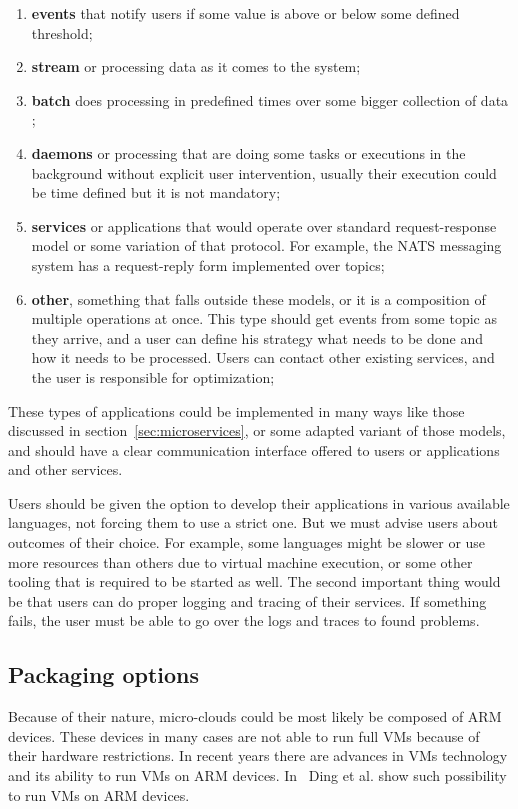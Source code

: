 \begin{enumerate}[start=1,label={(\bfseries \arabic*)}]
	\item \textbf{events} that notify users if some value is above or below some defined threshold; 
	\item \textbf{stream} or processing data as it comes to the system;
	\item \textbf{batch} does processing in predefined times over some bigger collection of data ;
	\item \textbf{daemons} or processing that are doing some tasks or executions in the background without explicit user intervention, usually their execution could be time defined but it is not mandatory;
	\item \textbf{services} or applications that would operate over standard request-response model or some variation of that protocol. For example, the NATS messaging system has a request-reply form implemented over topics;
	\item \textbf{other}, something that falls outside these models, or it is a composition of multiple operations at once. This type should get events from some topic as they arrive, and a user can define his strategy what needs to be done and how it needs to be processed. Users can contact other existing services, and the user is responsible for optimization;
\end{enumerate}

These types of applications could be implemented in many ways like those discussed in section~\ref{sec:microservices}, or some adapted variant of those models, and should have a clear communication interface offered to users or applications and other services. 

Users should be given the option to develop their applications in various available languages, not forcing them to use a strict one. But we must advise users about outcomes of their choice. For example, some languages might be slower or use more resources than others due to virtual machine execution, or some other tooling that is required to be started as well. The second important thing would be that users can do proper logging and tracing of their services. If something fails, the user must be able to go over the logs and traces to found problems.
%
\subsection{Packaging options}\label{sec:packaging}
%
Because of their nature, micro-clouds could be most likely be composed of ARM devices. These devices in many cases are not able to run full VMs because of their hardware restrictions. In recent years there are advances in VMs technology and its ability to run VMs on ARM devices. In~\cite{Ding12armvisor} Ding et al. show such possibility to run VMs on ARM devices.

